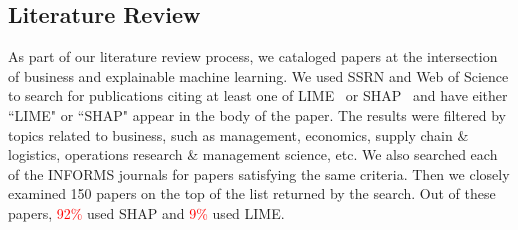 \documentclass[mnsc,blindrev]{informs3}
\begin{document}
    \subsection{Literature Review}
        \label{apx_sec:lit_review}
        As part of our literature review process, we cataloged papers at the intersection of business and explainable machine learning. We used SSRN and Web of Science to search for publications citing at least one of LIME~\citep{ribeiro16lime} or SHAP~\citep{lundberg17shap} and have either ``LIME" or ``SHAP" appear in the body of the paper.  The results were filtered by topics related to business, such as management, economics, supply chain \& logistics, operations research \& management science, etc. We also searched each of the INFORMS journals for papers satisfying the same criteria. Then we closely examined 150 papers on the top of the list returned by the search. Out of these papers, \textcolor{red}{92\%} used SHAP and \textcolor{red}{9\%} used LIME. %
\end{document}
